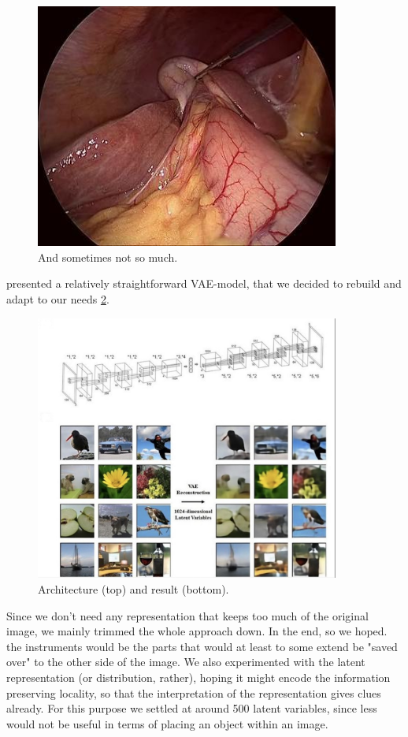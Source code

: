 \begin{figure}[H]
	\centering
	\includegraphics[width=10cm]{3_methodology/tools_bad}
	\caption{And sometimes not so much.}
	\label{fig:Tools_Bad}
\end{figure}

\cite{articleVAE} presented a relatively straightforward VAE-model, that we decided to rebuild and adapt to our needs \ref{fig:VAE}. 

\begin{figure}
	\centering
	\includegraphics[width=10cm]{3_methodology/VAE_arch}
	\caption{Architecture (top) and result (bottom).}
	\label{fig:VAE}
\end{figure}


Since we don't need any representation that keeps too much of the original image, we mainly trimmed the whole approach down.
In the end, so we hoped. the instruments would be the parts that would at least to some extend be "saved over" to the other side of the image. We also experimented with the latent representation (or distribution, rather), hoping it might encode the information preserving locality, so that the interpretation of the representation gives clues already. For this purpose we settled at around 500 latent variables, since less would not be useful in terms of placing an object within an image. 

